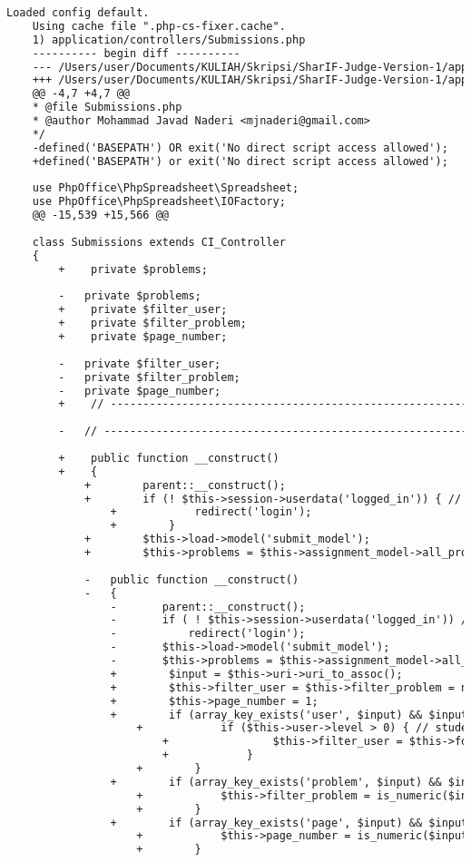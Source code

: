 \begin{lstlisting}[language=diff, caption=Perubahan pada kode Submissions.php]
	Loaded config default.
	Using cache file ".php-cs-fixer.cache".
	1) application/controllers/Submissions.php
	---------- begin diff ----------
	--- /Users/user/Documents/KULIAH/Skripsi/SharIF-Judge-Version-1/application/controllers/Submissions.php
	+++ /Users/user/Documents/KULIAH/Skripsi/SharIF-Judge-Version-1/application/controllers/Submissions.php
	@@ -4,7 +4,7 @@
	* @file Submissions.php
	* @author Mohammad Javad Naderi <mjnaderi@gmail.com>
	*/
	-defined('BASEPATH') OR exit('No direct script access allowed');
	+defined('BASEPATH') or exit('No direct script access allowed');
	
	use PhpOffice\PhpSpreadsheet\Spreadsheet;
	use PhpOffice\PhpSpreadsheet\IOFactory;
	@@ -15,539 +15,566 @@
	
	class Submissions extends CI_Controller
	{
		+    private $problems;
		
		-	private $problems;
		+    private $filter_user;
		+    private $filter_problem;
		+    private $page_number;
		
		-	private $filter_user;
		-	private $filter_problem;
		-	private $page_number;
		+    // ------------------------------------------------------------------------
		
		-	// ------------------------------------------------------------------------
		
		+    public function __construct()
		+    {
			+        parent::__construct();
			+        if (! $this->session->userdata('logged_in')) { // if not logged in
				+            redirect('login');
				+        }
			+        $this->load->model('submit_model');
			+        $this->problems = $this->assignment_model->all_problems($this->user->selected_assignment['id']);
			
			-	public function __construct()
			-	{
				-		parent::__construct();
				-		if ( ! $this->session->userdata('logged_in')) // if not logged in
				-			redirect('login');
				-		$this->load->model('submit_model');
				-		$this->problems = $this->assignment_model->all_problems($this->user->selected_assignment['id']);
				+        $input = $this->uri->uri_to_assoc();
				+        $this->filter_user = $this->filter_problem = null;
				+        $this->page_number = 1;
				+        if (array_key_exists('user', $input) && $input['user']) {
					+            if ($this->user->level > 0) { // students are not able to filter submissions by user
						+                $this->filter_user = $this->form_validation->alpha_numeric($input['user']) ? $input['user'] : null;
						+            }
					+        }
				+        if (array_key_exists('problem', $input) && $input['problem']) {
					+            $this->filter_problem = is_numeric($input['problem']) ? $input['problem'] : null;
					+        }
				+        if (array_key_exists('page', $input) && $input['page']) {
					+            $this->page_number = is_numeric($input['page']) ? $input['page'] : 1;
					+        }
				

\end{lstlisting}
